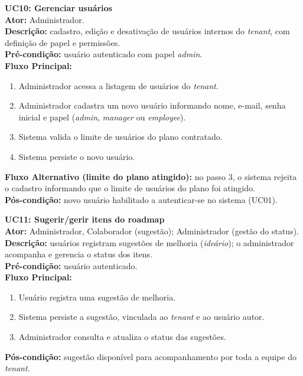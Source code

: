 \medskip
\noindent\textbf{UC10: Gerenciar usuários}\\
\textbf{Ator:} Administrador.\\
\textbf{Descrição:} cadastro, edição e desativação de usuários internos do \textit{tenant}, com definição de papel e permissões.\\
\textbf{Pré-condição:} usuário autenticado com papel \textit{admin}.\\
\textbf{Fluxo Principal:}
\begin{enumerate}
  \item Administrador acessa a listagem de usuários do \textit{tenant}.
  \item Administrador cadastra um novo usuário informando nome, e-mail, senha inicial e papel (\textit{admin}, \textit{manager} ou \textit{employee}).
  \item Sistema valida o limite de usuários do plano contratado.
  \item Sistema persiste o novo usuário.
\end{enumerate}
\textbf{Fluxo Alternativo (limite do plano atingido):} no passo 3, o sistema rejeita o cadastro informando que o limite de usuários do plano foi atingido.\\
\textbf{Pós-condição:} novo usuário habilitado a autenticar-se no sistema (UC01).

\medskip
\noindent\textbf{UC11: Sugerir/gerir itens do roadmap}\\
\textbf{Ator:} Administrador, Colaborador (sugestão); Administrador (gestão do status).\\
\textbf{Descrição:} usuários registram sugestões de melhoria (\textit{ideário}); o administrador acompanha e gerencia o status dos itens.\\
\textbf{Pré-condição:} usuário autenticado.\\
\textbf{Fluxo Principal:}
\begin{enumerate}
  \item Usuário registra uma sugestão de melhoria.
  \item Sistema persiste a sugestão, vinculada ao \textit{tenant} e ao usuário autor.
  \item Administrador consulta e atualiza o status das sugestões.
\end{enumerate}
\textbf{Pós-condição:} sugestão disponível para acompanhamento por toda a equipe do \textit{tenant}.

